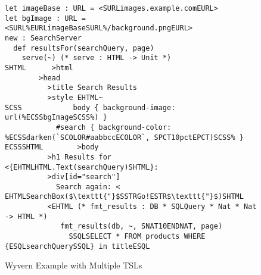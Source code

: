 \begin{figure}[t]
\begin{lstlisting}
let imageBase : URL = <SURLimages.example.comEURL>
let bgImage : URL = <SURL%EURLimageBaseSURL%/background.pngEURL>
new : SearchServer
  def resultsFor(searchQuery, page)
    serve(~) (* serve : HTML -> Unit *)
SHTML      >html
        >head
          >title Search Results
          >style EHTML~
SCSS            body { background-image: url(%ECSSbgImageSCSS%) }
            #search { background-color: %ECSSdarken(`SCOLOR#aabbccECOLOR`, SPCT10pctEPCT)SCSS% }
ECSSSHTML        >body
          >h1 Results for <{EHTMLHTML.Text(searchQuery)SHTML}:
          >div[id="search"]
            Search again: < EHTMLSearchBox($\texttt{"}$SSTRGo!ESTR$\texttt{"}$)SHTML
          <EHTML (* fmt_results : DB * SQLQuery * Nat * Nat -> HTML *)
             fmt_results(db, ~, SNAT10ENDNAT, page)
               SSQLSELECT * FROM products WHERE {ESQLsearchQuerySSQL} in titleESQL
\end{lstlisting}
\caption{Wyvern Example with Multiple TSLs}
\label{f-example}
\end{figure}
%
%
